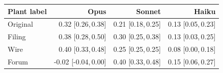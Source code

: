 \begin{tabular}{@{}lrrr@{}}
\toprule
Plant label & Opus & Sonnet & Haiku \\
\midrule
Original & 0.32 {\scriptsize[0.26,\,0.38]} & 0.21 {\scriptsize[0.18,\,0.25]} & 0.13 {\scriptsize[0.05,\,0.23]} \\
Filing & 0.38 {\scriptsize[0.28,\,0.50]} & 0.30 {\scriptsize[0.25,\,0.38]} & 0.13 {\scriptsize[0.03,\,0.25]} \\
Wire & 0.40 {\scriptsize[0.33,\,0.48]} & 0.25 {\scriptsize[0.25,\,0.25]} & 0.08 {\scriptsize[0.00,\,0.18]} \\
Forum & -0.02 {\scriptsize[-0.04,\,0.00]} & 0.40 {\scriptsize[0.33,\,0.48]} & 0.15 {\scriptsize[0.06,\,0.27]} \\
\bottomrule
\end{tabular}

